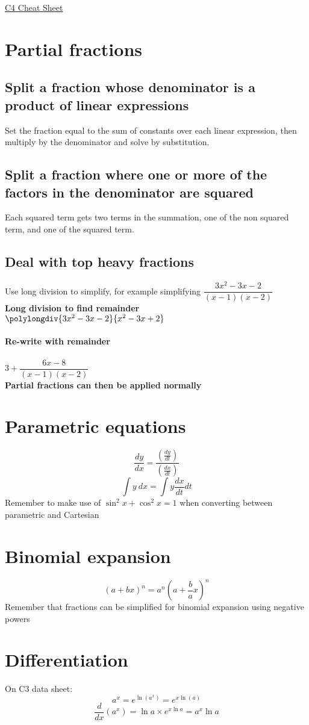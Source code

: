 \documentclass{article}[18pt]
\begin{document}
\begin{center}
\underline{\huge C4 Cheat Sheet}
\end{center}
\section{Partial fractions}
\subsection{Split a fraction whose denominator is a product of linear expressions}
Set the fraction equal to the sum of constants over each linear expression, then multiply by the denominator and solve by substitution.
\subsection{Split a fraction where one or more of the factors in the denominator are squared}
Each squared term gets two terms in the summation, one of the non squared term, and one of the squared term.
\subsection{Deal with top heavy fractions}
Use long division to simplify, for example simplifying $\dfrac{3x^2-3x-2}{(x-1)(x-2)}$\\
\textbf{Long division to find remainder}\\
$\polylongdiv{3x^2-3x-2}{x^2-3x+2}$\\
\\
\textbf{Re-write with remainder}\\
\\
$3+\dfrac{6x-8}{(x-1)(x-2)}$\\
\textbf{Partial fractions can then be applied normally}
\section{Parametric equations}
$$\frac{dy}{dx}=\frac{(\frac{dy}{dt})}{(\frac{dx}{dt})}$$
$$\int y \ dx=\int y\frac{dx}{dt}dt$$
Remember to make use of $\sin^2x+\cos^2x=1$ when converting between parametric and Cartesian
\section{Binomial expansion}
$$(a+bx)^n=a^n(a+\frac{b}{a}x)^n$$
Remember that fractions can be simplified for binomial expansion using negative powers
\section{Differentiation}
On C3 data sheet:
$$a^x=e^{\ln(a^x)}=e^{x\ln(a)}$$
$$\frac{d}{dx}(a^x)=\ln a\times e^{x\ln a}=a^x\ln a$$
\end{document}
